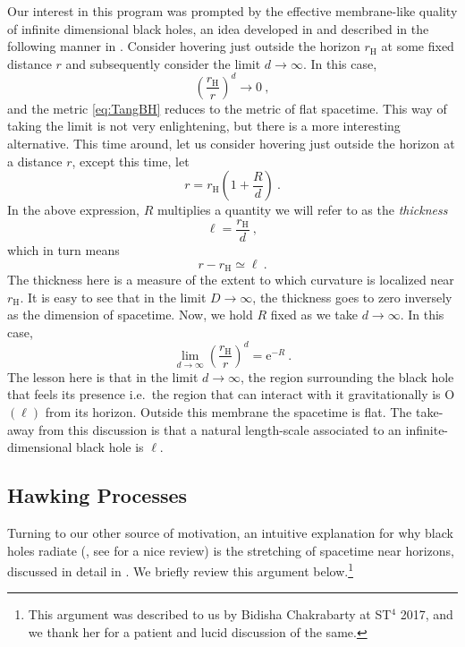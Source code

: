 \documentclass[a4paper,11pt]{article}
\newcommand{\e}[1]{\text{e}^{#1}}
\newcommand{\rH}{r_{\text{H}}}
\begin{document}
Our interest in this program was prompted by the effective membrane-like quality of infinite dimensional black holes, an idea developed in \cite{Emparan:2013moa} and described in the following manner in \citep{Bhattacharyya:2015dva}. Consider hovering just outside the horizon $r_{\text{H}}$ at some fixed distance $r$ and subsequently consider the limit $d \rightarrow \infty$. In this case,
\begin{equation}
\left(\frac{r_\text{H}}{r}\right)^{d} \rightarrow 0 \ ,
\end{equation}
and the metric \eqref{eq:TangBH} reduces to the metric of flat spacetime. This way of taking the limit is not very enlightening, but there is a more interesting alternative. This time around, let us consider hovering just outside the horizon at a distance $r$, except this time, let 
\begin{equation}
r = r_{\text{H}} \left( 1 + \frac{R}{d} \right) \ .
\end{equation}
In the above expression, $R$ multiplies a quantity we will refer to as the \emph{thickness}
\begin{equation}
\ell = \frac{r_{\text{H}}}{d} \ ,
\end{equation}
which in turn means
\begin{equation}
r - r_{\text{H}} \simeq \ell \ .
\end{equation}
The thickness here is a measure of the extent to which curvature is localized near $\rH$. It is easy to see that in the limit $D \rightarrow \infty$, the thickness goes to zero inversely as the dimension of spacetime. Now, we hold $R$ fixed as we take $d \rightarrow \infty$. In this case, 
\begin{equation}
\lim_{d\rightarrow \infty} \left(\frac{r_\text{H}}{r}\right)^{d} = \e{-R} \ .
\end{equation}
The lesson here is that in the limit $d \rightarrow \infty$, the region surrounding the black hole that feels its presence i.e.~the region that can interact with it gravitationally is O$(\ell)$ from its horizon. Outside this membrane the spacetime is flat. The take-away from this discussion is that a natural length-scale associated to an infinite-dimensional black hole is $\ell$.

\subsection*{Hawking Processes}
Turning to our other source of motivation, an intuitive explanation for why black holes radiate (\cite{Hawking:1974sw}, see \cite{Jacobson:2003vx} for a nice review) is the stretching of spacetime near horizons, discussed in detail in \cite{Mathur:2008wi}. We briefly review this argument below.\footnote{This argument was described to us by Bidisha Chakrabarty at ST$^4$ 2017, and we thank her for a patient and lucid discussion of the same.}
\end{document}
